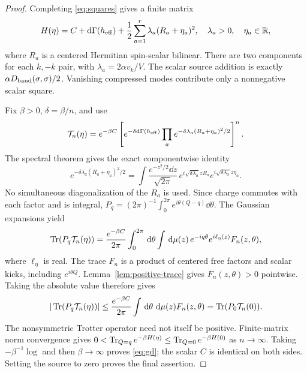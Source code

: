 \begin{proof}
Completing \eqref{eq:squares} gives a finite matrix
\[
H(\eta)=C+\mathrm d\Gamma(h_{\mathrm{eff}})
+\frac12\sum_{a=1}^r\lambda_a(R_a+\eta_a)^2,\quad
\lambda_a>0,\quad\eta_a\in\mathbb R ,
\]
where $R_a$ is a centered Hermitian spin-scalar bilinear.
There are two components for each $k,-k$ pair, with
$\lambda_a=2\alpha v_k/V$. The scalar source addition is exactly
$\alpha D_{\rm band}(\sigma,\sigma)/2$.
Vanishing compressed modes contribute only a nonnegative scalar square.

Fix $\beta>0$, $\delta=\beta/n$, and use
\[
\mathcal T_n(\eta)=e^{-\beta C}
\left[e^{-\delta\mathrm d\Gamma(h_{\mathrm{eff}})}
\prod_a e^{-\delta\lambda_a(R_a+\eta_a)^2/2}\right]^n.
\]
The spectral theorem gives the exact componentwise identity
\begin{equation}
e^{-\delta\lambda_a(R_a+\eta_a)^2/2}
=\int\frac{e^{-z^2/2}\dd z}{\sqrt{2\pi}}\,
e^{i\sqrt{\delta\lambda_a}zR_a}
e^{i\sqrt{\delta\lambda_a}z\eta_a}.
\label{eq:HS}
\end{equation}
No simultaneous diagonalization of the $R_a$ is used.
Since charge commutes with each factor and is integral,
$P_q=(2\pi)^{-1}\int_0^{2\pi}e^{i\theta(Q-q)}\dd\theta$.
The Gaussian expansions yield
\begin{equation}
\operatorname{Tr}(P_q\mathcal T_n(\eta))
=\frac{e^{-\beta C}}{2\pi}
\int_0^{2\pi}\,\mathrm d\theta\int\,\mathrm d\mu(z)\,
e^{-iq\theta}e^{i\ell_\eta(z)}F_n(z,\theta),
\label{eq:canonical}
\end{equation}
where $\ell_\eta$ is real. The trace $F_n$ is a product of centered
free factors and scalar kicks, including $e^{i\theta Q}$.
Lemma~\ref{lem:positive-trace} gives $F_n(z,\theta)>0$ pointwise.
Taking the absolute value therefore gives
\begin{equation}
|\operatorname{Tr}(P_q\mathcal T_n(\eta))|
\le\frac{e^{-\beta C}}{2\pi}\int\,\mathrm d\theta\,\,\mathrm d\mu(z)F_n(z,\theta)
=\operatorname{Tr}(P_0\mathcal T_n(0)).
\label{eq:partition}
\end{equation}
The nonsymmetric Trotter operator need not itself be positive.
Finite-matrix norm convergence gives
$0<\operatorname{Tr}_{Q=q}e^{-\beta H(\eta)}
\le\operatorname{Tr}_{Q=0}e^{-\beta H(0)}$ as $n\to\infty$.
Taking $-\beta^{-1}\log$ and then $\beta\to\infty$ proves
\eqref{eq:gd}; the scalar $C$ is identical on both sides.
Setting the source to zero proves the final assertion.
\end{proof}

